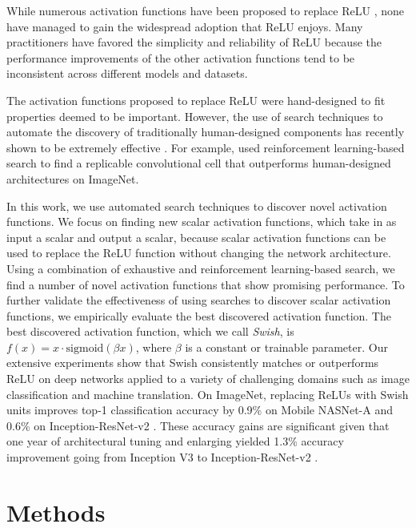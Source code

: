 \documentclass{article} %
\begin{document}
While numerous activation functions have been proposed to replace ReLU \citep{maas2013rectifier,he2015delving,clevert2015fast,klambauer2017self}, none have managed to gain the widespread adoption that ReLU enjoys. Many practitioners have favored the simplicity and reliability of ReLU because the performance improvements of the other activation functions tend to be inconsistent across different models and datasets.

The activation functions proposed to replace ReLU were hand-designed to fit properties deemed to be important. However, the use of search techniques to automate the discovery of traditionally human-designed components has recently shown to be extremely effective \citep{zoph2016neural,bello2017neural,zoph2017learning}. For example, \citet{zoph2017learning} used reinforcement learning-based search to find a replicable convolutional cell that outperforms human-designed architectures on ImageNet. 

In this work, we use automated search techniques to discover novel activation functions. We focus on finding new scalar activation functions, which take in as input a scalar and output a scalar, because scalar activation functions can be used to replace the ReLU function without changing the network architecture. Using a combination of exhaustive and reinforcement learning-based search, we find a number of novel activation functions that show promising performance. To further validate the effectiveness of using searches to discover scalar activation functions, we empirically evaluate the best discovered activation function. The best discovered activation function, which we call \emph{Swish}, is $f(x) = x \cdot \text{sigmoid}(\beta x)$, where $\beta$ is a constant or trainable parameter. Our extensive experiments show that Swish consistently matches or outperforms ReLU on deep networks applied to a variety of challenging domains such as image classification and machine translation. On ImageNet, replacing ReLUs with Swish units improves top-1 classification accuracy by 0.9\% on Mobile NASNet-A \citep{zoph2017learning} and 0.6\% on Inception-ResNet-v2 \citep{szegedy2017inception}. These accuracy gains are significant given that one year of architectural tuning and enlarging yielded 1.3\% accuracy improvement going from Inception V3 \citep{szegedy2016inception} to Inception-ResNet-v2 \citep{szegedy2017inception}.

\section{Methods}
\end{document}
